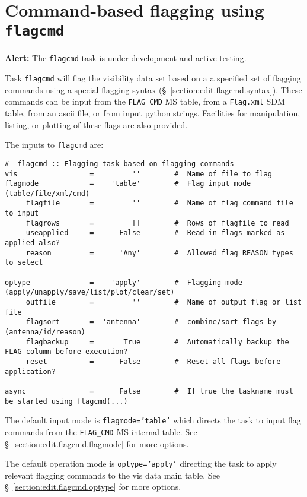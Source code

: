 \section{Command-based flagging using {\tt flagcmd}}
\label{section:edit.flagcmd}

{\bf Alert:} The {\tt flagcmd} task is under development and
active testing.  

Task {\tt flagcmd} will flag the visibility data set based on a
a specified set of flagging commands using a special flagging 
syntax (\S~\ref{section:edit.flagcmd.syntax}).  These commands
can be input from the {\tt FLAG\_CMD} MS table, from a 
{\tt Flag.xml} SDM table, from an ascii
file, or from input python strings.  Facilities for manipulation,
listing, or plotting of these flags are also provided.

The inputs to {\tt flagcmd} are:
\small
\begin{verbatim}
#  flagcmd :: Flagging task based on flagging commands
vis                 =         ''        #  Name of file to flag
flagmode            =    'table'        #  Flag input mode (table/file/xml/cmd)
     flagfile       =         ''        #  Name of flag command file to input
     flagrows       =         []        #  Rows of flagfile to read
     useapplied     =      False        #  Read in flags marked as applied also?
     reason         =      'Any'        #  Allowed flag REASON types to select

optype              =    'apply'        #  Flagging mode (apply/unapply/save/list/plot/clear/set)
     outfile        =         ''        #  Name of output flag or list file
     flagsort       =  'antenna'        #  combine/sort flags by (antenna/id/reason)
     flagbackup     =       True        #  Automatically backup the FLAG column before execution?
     reset          =      False        #  Reset all flags before application?

async               =      False        #  If true the taskname must be started using flagcmd(...)
\end{verbatim}
\normalsize

The default input mode is {\tt flagmode='table'} which directs the
task to input flag commands from the {\tt FLAG\_CMD} MS internal
table. See \S~\ref{section:edit.flagcmd.flagmode} for more options.

The default operation mode is {\tt optype='apply'} directing the
task to apply relevant flagging commands to the vis data main table.
See \S~\ref{section:edit.flagcmd.optype} for more options.

